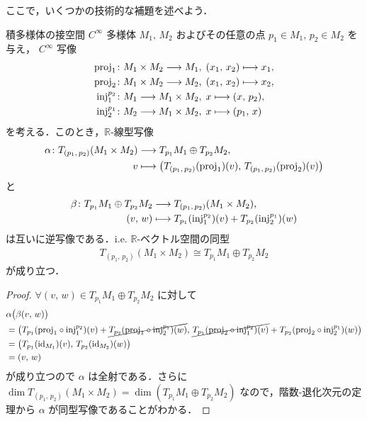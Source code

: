 \documentclass[TQFT_main]{subfiles}
\begin{document}
ここで，いくつかの技術的な補題を述べよう．

\begin{mylem}[label=lem:tangent-product,breakable]{積多様体の接空間}
    $C^\infty$ 多様体 $M_1,\, M_2$ およびその任意の点 $p_1 \in M_1,\, p_2 \in M_2$ を与え，
    $C^\infty$ 写像
    \begin{align}
        \mathrm{proj}_1 &\colon M_1 \times M_2 \longrightarrow M_1,\; (x_1,\, x_2) \longmapsto x_1, \\
        \mathrm{proj}_2 &\colon M_1 \times M_2 \longrightarrow M_2,\; (x_1,\, x_2) \longmapsto x_2, \\
        \mathrm{inj}_1^{p_2} &\colon M_1 \longrightarrow M_1 \times M_2,\; x \longmapsto (x,\, p_2), \\
        \mathrm{inj}_2^{p_1} &\colon M_2 \longrightarrow M_1 \times M_2,\; x \longmapsto (p_1,\, x)
    \end{align}
    を考える．このとき，$\mathbb{R}$-線型写像
    \begin{align}
        \alpha \colon T_{(p_1,\, p_2)}(M_1 \times M_2) &\longrightarrow T_{p_1} M_1 \oplus T_{p_2} M_2,\\ 
        v &\longmapsto \bigl( T_{(p_1,\, p_2)} (\mathrm{proj}_1)(v),\, T_{(p_1,\, p_2)} (\mathrm{proj}_2)(v) \bigr)
    \end{align}
    と
    \begin{align}
        \beta \colon T_{p_1} M_1 \oplus T_{p_2} M_2 &\longrightarrow T_{(p_1,\, p_2)}(M_1 \times M_2),\\ 
        (v,\, w) &\longmapsto T_{p_1} (\mathrm{inj}_1^{p_2})(v) + T_{p_2} (\mathrm{inj}_2^{p_1})(w)
    \end{align}
    は互いに逆写像である．i.e. $\mathbb{R}$-ベクトル空間の同型
    \begin{align}
        T_{(p_1,\, p_2)}(M_1 \times M_2) \cong T_{p_1} M_1 \oplus T_{p_2} M_2
    \end{align}
    が成り立つ．
\end{mylem}

\begin{proof}
    $\forall (v,\, w) \in T_{p_1}M_1 \oplus T_{p_2}M_2$ に対して
    \begin{align}
        &\alpha \bigl( \beta(v,\, w)\bigr)\\
        &= \bigl( T_{p_1}(\mathrm{proj}_1 \circ \mathrm{inj}_1^{p_2})(v) + \cancel{T_{p_2}(\mathrm{proj}_1 \circ \mathrm{inj}_2^{p_1})(w)},\, \cancel{T_{p_1}(\mathrm{proj}_2 \circ \mathrm{inj}_1^{p_2})(v)} + T_{p_2}(\mathrm{proj}_2 \circ \mathrm{inj}_2^{p_1})(w) \bigr)  \\
        &= \bigl( T_{p_1}(\mathrm{id}_{M_1})(v),\, T_{p_2}(\mathrm{id}_{M_2}) (w) \bigr) \\
        &= (v,\, w)
    \end{align}
    が成り立つので $\alpha$ は全射である．さらに $\dim T_{(p_1,\, p_2)}(M_1 \times M_2) = \dim  (T_{p_1} M_1 \oplus T_{p_2} M_2)$ なので，階数-退化次元の定理から $\alpha$ が同型写像であることがわかる．
\end{proof}
\end{document}
